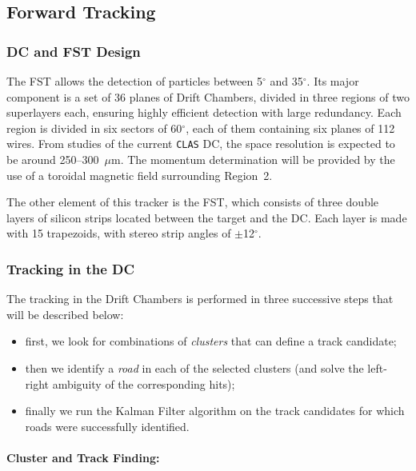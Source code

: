 \subsection{Forward Tracking}
\label{sec_forward}

\subsubsection{DC and FST Design}

The FST allows the detection of particles between 5$^\circ$ and 35$^\circ$.  Its 
major component is a set of 36 planes of Drift Chambers, divided in three regions of 
two superlayers each, ensuring highly efficient detection with large redundancy. 
Each region is divided in six sectors of 60$^\circ$, each of them containing six 
planes of 112 wires.  From studies of the current {\tt CLAS} DC, the space resolution 
is expected to be around 250--300~$\mu$m.  The momentum determination will be provided 
by the use of a toroidal magnetic field surrounding Region~2.

The other element of this tracker is the FST, which consists of three double layers of 
silicon strips located between the target and the DC.  Each layer is made with 15 
trapezoids, with stereo strip angles of $\pm$12$^\circ$.  

\subsubsection{Tracking in the DC}

The tracking in the Drift Chambers is performed in three successive steps that will be 
described below:

\begin{itemize}
\item first, we look for combinations of \emph{clusters} that can define a track 
candidate;
\item then we identify a \emph{road} in each of the selected clusters (and solve the 
left-right ambiguity of the corresponding hits);
\item finally we run the Kalman Filter algorithm on the track candidates for which 
roads were successfully identified.
\end{itemize}

\paragraph{Cluster and Track Finding:}


